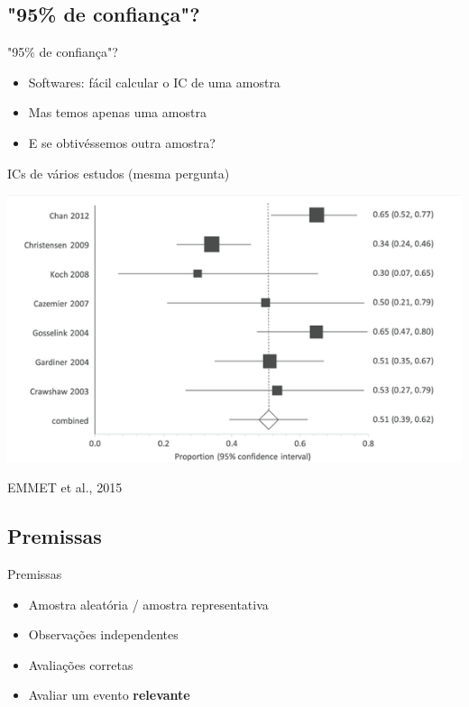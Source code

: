 \documentclass{beamer}
\begin{document}
\subsection{"95\% de confiança"?}

\begin{frame}{"95\% de confiança"?}
  \begin{itemize}
  \item Softwares: fácil calcular o IC de uma amostra
  \item Mas temos apenas \alert{uma} amostra
  \item E se obtivéssemos outra amostra?
  \end{itemize}
\end{frame}

\begin{frame}{\scriptsize ICs de vários estudos (mesma pergunta)}
  \begin{center}
    \includegraphics[width=.8\textwidth]{Cap2/IC-prop-n-amostras.png}
  \end{center}

  \vfill
  \hfill \tiny EMMET et al., 2015
\end{frame}

\subsection{Premissas}

\begin{frame}{Premissas}
  \begin{itemize}
  \item Amostra aleatória / amostra representativa
  \item Observações independentes
  \item Avaliações corretas
  \item Avaliar um evento {\bf relevante}
  \end{itemize}
\end{frame}
\end{document}
